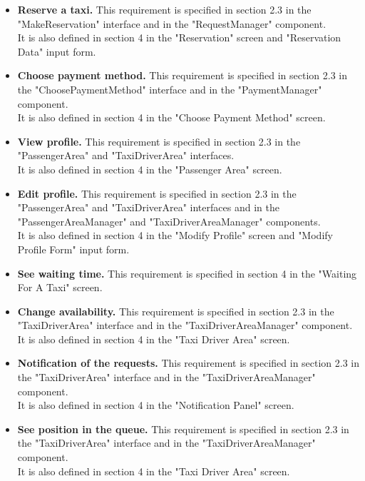 \documentclass[18pt,oneside,a4paper, titlepage]{article}
\begin{document}
\begin{itemize}
			\item \textbf{Reserve a taxi.} This requirement is specified in  section 2.3 in the "MakeReservation" interface and in the "RequestManager" component.\\ It is also defined in section 4 in the "Reservation" screen and "Reservation Data" input form.
			
			\item \textbf{Choose payment method.} This requirement is specified in section 2.3 in the "ChoosePaymentMethod" interface and in the "PaymentManager" component.\\ It is also defined in section 4 in the "Choose Payment Method" screen.
			
			\item \textbf{View profile.} This requirement is specified in section 2.3 in the "PassengerArea" and "TaxiDriverArea" interfaces.\\ It is also defined in section 4 in the "Passenger Area" screen.
			
			\item \textbf{Edit profile.} This requirement is specified in section 2.3 in the "PassengerArea" and "TaxiDriverArea" interfaces and in the "PassengerAreaManager" and "TaxiDriverAreaManager" components.\\ It is also defined in section 4 in the "Modify Profile" screen and "Modify Profile Form" input form.
			
			\item \textbf{See waiting time.} This requirement is specified in section 4 in the "Waiting For A Taxi" screen.
			
			\item \textbf{Change availability.} This requirement is specified in section 2.3 in the "TaxiDriverArea" interface and in the "TaxiDriverAreaManager" component. \\ It is also defined in section 4 in the "Taxi Driver Area" screen.
			
			\item \textbf{Notification of the requests.} This requirement is specified in section 2.3 in the "TaxiDriverArea" interface and in the "TaxiDriverAreaManager" component. \\ It is also defined in section 4 in the "Notification Panel" screen.
			
			\item \textbf{See position in the queue.} This requirement is specified in section 2.3 in the "TaxiDriverArea" interface and in the "TaxiDriverAreaManager" component. \\It is also defined in section 4 in the "Taxi Driver Area" screen.
		\end{itemize}
\end{document}
